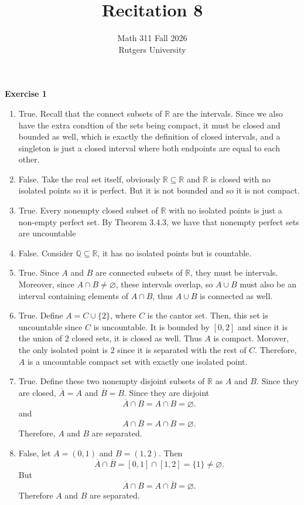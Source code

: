\documentclass[12pt]{article}
\title{Recitation 8}
\author{Math 311 Fall 2026 \\ Rutgers University}
\date{}
\begin{document}
\maketitle

\textbf{Exercise 1}
\begin{enumerate}[label=(\alph*)]
    \item True. Recall that the connect subsets of \( \mathbb{R} \) are the intervals. Since we also have the extra condtion of the sets being compact, it must be closed and bounded as well, which is exactly the definition of closed intervals, and a singleton is just a closed interval where both endpoints are equal to each other.
    \item False. Take the real set itself, obviously \( \mathbb{R} \subseteq \mathbb{R} \) and \( \mathbb{R} \) is closed with no isolated points so it is perfect. But it is not bounded and so it is not compact.
    \item True. Every nonempty closed subset of \( \mathbb{R} \) with no isolated points is just a non-empty perfect set. By Theorem 3.4.3, we have that nonempty perfect sets are uncountable
    \item False. Consider \( \mathbb{Q} \subseteq \mathbb{R} \), it has no isolated points but is countable.
    \item True. Since \( A \) and \( B \) are connected subsets of \( \mathbb{R} \), they must be intervals. Moreover, since \( A \cap B \neq \varnothing \), these intervals overlap, so \( A \cup B \) must also be an interval containing elements of \( A \cap B \), thus \( A \cup B \) is connected as well.
    \item True. Define \( A = C \cup \{2\} \), where \( C \) is the cantor set. Then, this set is uncountable since \( C \) is uncountable. It is bounded by \( [0,2] \) and since it is the union of 2 closed sets, it is closed as well. Thus \( A \) is compact. Morover, the only isolated point is \( 2 \) since it is separated with the rest of \( C \). Therefore, \( A \) is a uncountable compact set with exactly one isolated point.
    \item True. Define these two nonempty disjoint subsets of \( \mathbb{R} \) as \( A \) and \( B \). Since they are closed, \( \overline{A} = A \) and \( \overline{B} = B \). Since they are disjoint
          \[
              \overline{A} \cap  B = A \cap B = \varnothing .
          \]
          and
          \[
              A \cap \overline{B} = A \cap B = \varnothing .
          \]
          Therefore, \( A \) and \( B \) are separated.

    \item False, let \( A = (0,1) \) and \( B = (1,2) \). Then
          \[
              \overline{A} \cap \overline{B} = [0,1] \cap [1,2] = \{1\} \neq \varnothing .
          \]
          But
          \[
              \overline{A} \cap B = A \cap \overline{B} = \varnothing .
          \]
          Therefore \( A \) and \( B \) are separated.

\end{enumerate}
\end{document}
